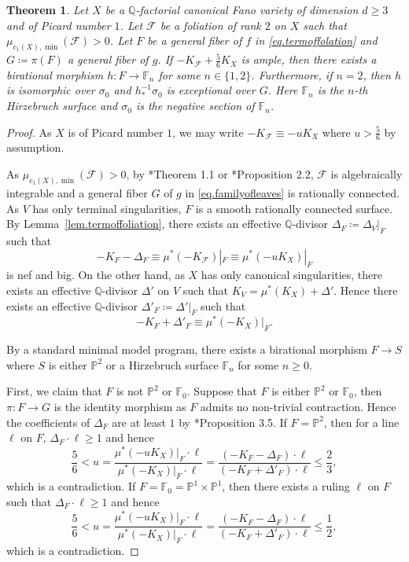 \documentclass[12pt,twoside]{amsart}
\newtheorem{thm}{Theorem}[section]
\theoremstyle{definition}
\begin{document}
\begin{thm}\label{thm.hirzebruch}
    Let $X$ be a $\mathbb Q$-factorial canonical Fano variety of dimension $d\geq 3$ and of Picard number $1$. Let $\mathcal{F}$ be a foliation of rank $2$ on $X$ such that $\mu_{c_1(X),\min}(\mathcal F)>0$. Let $F$ be a general fiber of $f$ in \eqref{eq.termoffolation} and $G\coloneq \pi(F)$ a general fiber of $g$. If $-K_{\mathcal F}+\frac{5}{6}K_X$ is ample, then there exists a birational morphism $h\colon F\to \mathbb{F}_n$ for some $n\in\{1,2\}$. Furthermore, if $n=2$, then $h$ is isomorphic over $\sigma_0$ and $h_*^{-1}\sigma_0$ is exceptional over $G$. Here $\mathbb F_n$ is the $n$-th Hirzebruch surface and $\sigma_0$ is the negative section of $\mathbb F_n$.
\end{thm}

\begin{proof}
    As $X$ is of Picard number $1$, we may write $-K_{\mathcal{F}}\equiv -uK_X$ where $u>\frac{5}{6}$ by assumption. 

    As $\mu_{c_1(X),\min}(\mathcal F)>0$, by \cite{cp}*{Theorem 1.1} or \cite{ouwenhao}*{Proposition 2.2}, $\mathcal F$ is algebraically integrable and a general fiber $G$ of $g$ in \eqref{eq.familyofleaves} is rationally connected. As $V$ has only terminal singularities, $F$ is a smooth rationally connected surface. By Lemma~\ref{lem.termoffoliation}, there exists an effective $\mathbb{Q}$-divisor $\Delta_F\coloneq \Delta_V|_F$ such that 
    \[
        -K_F-\Delta_F\equiv \mu^*(-K_{\mathcal F})|_F\equiv \mu^*(-uK_X)|_F
    \]
    is nef and big. On the other hand, as $X$ has only canonical singularities, there exists an effective $\mathbb{Q}$-divisor $\Delta'$ on $V$ such that $ K_V=\mu^*(K_X)+\Delta'$. Hence there exists an effective $\mathbb{Q}$-divisor $\Delta'_F\coloneq \Delta'|_F$ such that 
    \[
        -K_F+\Delta'_F\equiv\mu^*(-K_X)|_F.
    \]

    By a standard minimal model program, there exists a birational morphism $F\to S$ where $S$ is either $\mathbb P^2$ or a Hirzebruch surface $\mathbb F_n$ for some $n\geq 0$.

    First, we claim that $F$ is not $\mathbb{P}^2$ or $\mathbb{F}_0$. Suppose that $F$ is either $\mathbb{P}^2$ or $\mathbb{F}_0$, then $\pi\colon F\to G$ is the identity morphism as $F$ admits no non-trivial contraction. Hence the coefficients of $\Delta_F$ are at least $1$ by \cite{jiang-liu-liu}*{Proposition 3.5}. If $F=\mathbb{P}^2$, then for a line $\ell$ on $F$, $\Delta_F\cdot \ell\geq 1$ and hence
    \[ 
        \frac{5}{6}<u=\frac{\mu^*(-uK_X)|_F\cdot \ell }{\mu^*(-K_X)|_F \cdot \ell }=\frac{(-K_F-\Delta_F)\cdot \ell }{(-K_F+\Delta'_F)\cdot \ell }\leq \frac{2}{3},
    \] 
    which is a contradiction.
    If $F=\mathbb{F}_0=\mathbb{P}^1\times \mathbb{P}^1$, then there exists a ruling $\ell$ on $F$ such that $\Delta_F\cdot \ell\geq 1$ and hence
    \[ 
        \frac{5}{6}<u=\frac{\mu^*(-uK_X)|_F\cdot \ell }{\mu^*(-K_X)|_F \cdot \ell }=\frac{(-K_F-\Delta_F)\cdot \ell }{(-K_F+\Delta'_F)\cdot \ell }\leq \frac{1}{2},
    \]
    which is a contradiction.


\end{proof}
\end{document}
